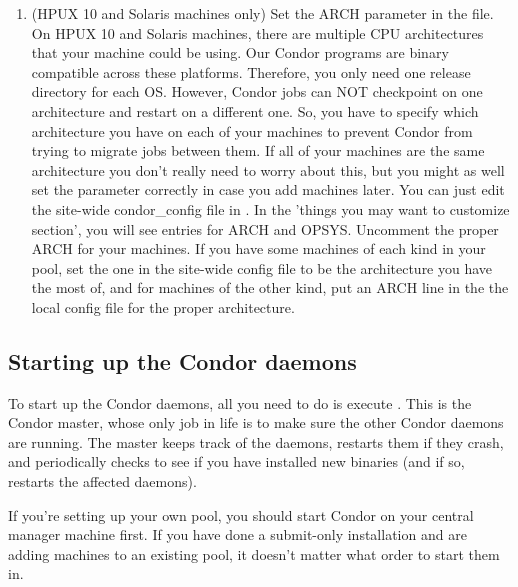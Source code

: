 \begin{enumerate}
\item   (HPUX 10 and Solaris machines only) Set the ARCH parameter in the
     file.  On HPUX 10 and Solaris machines, there are
    multiple CPU architectures that your machine could be using.  Our
    Condor programs are binary compatible across these platforms.
    Therefore, you only need one release directory for each OS.
    However, Condor jobs can NOT checkpoint on one architecture and
    restart on a different one.  So, you have to specify which
    architecture you have on each of your machines to prevent Condor
    from trying to migrate jobs between them.  If all of your machines
    are the same architecture you don't really need to worry about
    this, but you might as well set the parameter correctly in case
    you add machines later.  You can just edit the site-wide
    condor\_config file in .  In the
    'things you may want to customize section', you will see entries
    for ARCH and OPSYS.  Uncomment the proper ARCH for your machines.
    If you have some machines of each kind in your pool, set the one
    in the site-wide config file to be the architecture you have the
    most of, and for machines of the other kind, put an ARCH line in
    the the local config file for the proper architecture.
\end{enumerate}

\subsection{Starting up the Condor daemons}

To start up the Condor daemons, all you need to do is execute
.  This is the Condor master, whose
only job in life is to make sure the other Condor daemons are running.
The master keeps track of the daemons, restarts them if they crash,
and periodically checks to see if you have installed new binaries (and
if so, restarts the affected daemons).

If you're setting up your own pool, you should start Condor on your
central manager machine first.  If you have done a submit-only
installation and are adding machines to an existing pool, it doesn't
matter what order to start them in.

